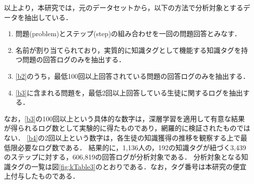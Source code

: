 以上より，本研究では，元のデータセットから，以下の方法で分析対象とするデータを抽出している．
\begin{enumerate}
	\item 問題(problem)とステップ(step)の組み合わせを一回の問題回答とみなす．\label{b1}
	\item 名前が割り当てられており，実質的に知識タグとして機能する知識タグを持つ問題の回答ログのみを抽出する．\label{b2}
	\item \ref{b2}のうち，最低100回以上回答されている問題の回答ログのみを抽出する．\label{b3}
	\item \ref{b3}に含まれる問題を，最低2回以上回答している生徒に関するログを抽出する．\label{b4}
\end{enumerate}

なお，\ref{b3}の100回以上という具体的な数字は，深層学習を適用して有意な結果が得られるログ数として実験的に得たものであり，網羅的に検証されたものではない．
\ref{b4}の2回以上という数字は，各生徒の知識獲得の推移を観察する上で最低限必要なログ数である．
結果的に，1,136人の，192の知識タグが紐づく3,439のステップに対する，606,819の回答ログが分析対象である．
分析対象となる知識タグの一覧は図\ref{fig:kTable3}のとおりである．なお，タグ番号は本研究の便宜上付与したものである．

